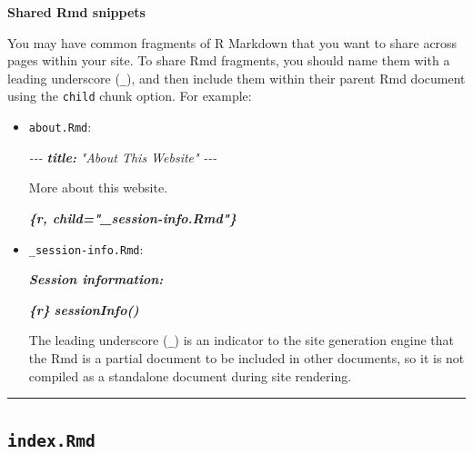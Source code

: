 \documentclass[
  a4paper,
  twoside,
  openright]{book}
\newenvironment{Shaded}{\begin{snugshade}}{\end{snugshade}}
\newcommand{\AnnotationTok}[1]{\textcolor[rgb]{0.56,0.35,0.01}{\textbf{\textit{#1}}}}
\newcommand{\CommentTok}[1]{\textcolor[rgb]{0.56,0.35,0.01}{\textit{#1}}}
\newcommand{\InformationTok}[1]{\textcolor[rgb]{0.56,0.35,0.01}{\textbf{\textit{#1}}}}
\newcommand{\NormalTok}[1]{#1}
\theoremstyle{definition}
\theoremstyle{definition}
\theoremstyle{definition}
\theoremstyle{definition}
\theoremstyle{remark}
\begin{document}
\textbf{Shared Rmd snippets}

You may have common fragments of R Markdown that you want to share across pages within your site. To share Rmd fragments, you should name them with a leading underscore (\texttt{\_}), and then include them within their parent Rmd document using the \texttt{child} chunk option. For example:

\begin{itemize}
\item
  \texttt{about.Rmd}:

\begin{Shaded}
\begin{Highlighting}[]
\CommentTok{{-}{-}{-}}
\AnnotationTok{title:}\CommentTok{ "About This Website"}
\CommentTok{{-}{-}{-}}

\NormalTok{More about this website.}

\InformationTok{\textasciigrave{}\textasciigrave{}\textasciigrave{}\{r, child="\_session{-}info.Rmd"\}}
\InformationTok{\textasciigrave{}\textasciigrave{}\textasciigrave{}}
\end{Highlighting}
\end{Shaded}
\item
  \texttt{\_session-info.Rmd}:

\begin{Shaded}
\begin{Highlighting}[]
\AnnotationTok{Session information:}

\InformationTok{\textasciigrave{}\textasciigrave{}\textasciigrave{}\{r\}}
\InformationTok{sessionInfo()}
\InformationTok{\textasciigrave{}\textasciigrave{}\textasciigrave{}}
\end{Highlighting}
\end{Shaded}

  The leading underscore (\texttt{\_}) is an indicator to the site generation engine that the Rmd is a partial document to be included in other documents, so it is not compiled as a standalone document during site rendering.
\end{itemize}

\begin{center}\rule{0.5\linewidth}{0.5pt}\end{center}

\subsection*{\texorpdfstring{\texttt{index.Rmd}}{index.Rmd}}\label{index.rmd}
\end{document}
